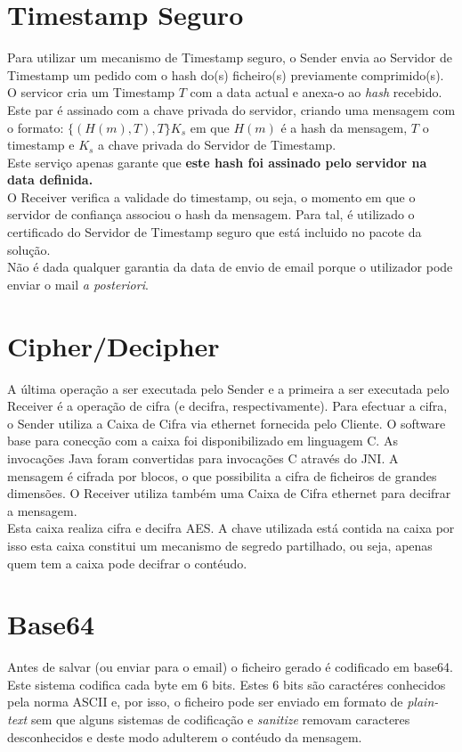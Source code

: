 \section{Timestamp Seguro}
\label{section:timestamp}
Para utilizar um mecanismo de Timestamp seguro, o Sender envia ao Servidor de Timestamp um pedido com o hash do(s) ficheiro(s) previamente comprimido(s).\\
 O servicor cria um Timestamp $T$ com a data actual e anexa-o ao \textit{hash} recebido. Este par é assinado com a chave privada do servidor, criando uma mensagem com o formato: $\{(H(m),T),T\}K_s$
em que $H(m)$ é a hash da mensagem, $T$ o timestamp e $K_s$ a chave privada do Servidor de Timestamp. \\
Este serviço apenas garante que \textbf{este hash foi assinado pelo servidor na data definida.} \\

O Receiver verifica a validade do timestamp, ou seja, o momento em que o servidor de confiança associou o hash da mensagem. Para tal, é utilizado o certificado do Servidor de Timestamp seguro que está incluido no pacote da solução. \\
Não é dada qualquer garantia da data de envio de email porque o utilizador pode enviar o mail \textit{a posteriori}. \\

\section{Cipher/Decipher}
A última operação a ser executada pelo Sender e a primeira a ser executada pelo Receiver é a operação de cifra (e decifra, respectivamente).
Para efectuar a cifra, o Sender utiliza a Caixa de Cifra via ethernet fornecida pelo Cliente. O software base para conecção com a caixa foi disponibilizado em linguagem C. As invocações Java foram convertidas para invocações C através do JNI.
A mensagem é cifrada por blocos, o que possibilita a cifra de ficheiros de grandes dimensões.
O Receiver utiliza também uma Caixa de Cifra ethernet para decifrar a mensagem.\\
Esta caixa realiza cifra e decifra AES. A chave utilizada está contida na caixa por isso esta caixa constitui um mecanismo de segredo partilhado, ou seja, apenas quem tem a caixa pode decifrar o contéudo.

\section{Base64}
Antes de salvar (ou enviar para o email) o ficheiro gerado é codificado em base64. Este sistema codifica cada byte em 6 bits. Estes 6 bits são caractéres conhecidos pela norma ASCII e, por isso, o ficheiro pode ser enviado em formato de \textit{plain-text} sem que alguns sistemas de codificação e \textit{sanitize} removam caracteres desconhecidos e deste modo adulterem o contéudo da mensagem.


